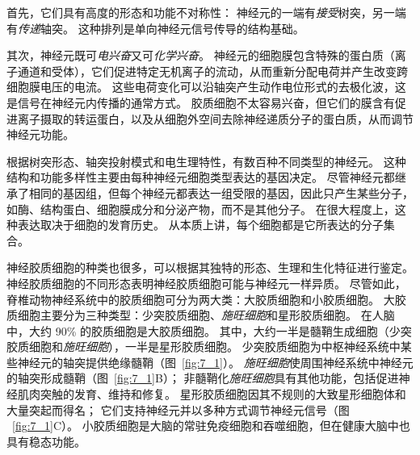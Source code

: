 首先，它们具有高度的形态和功能不对称性：
神经元的一端有\textit{接受}树突，另一端有\textit{传递}轴突。
这种排列是单向神经元信号传导的结构基础。


其次，神经元既可\textit{电兴奋}又可\textit{化学兴奋}。
神经元的细胞膜包含特殊的蛋白质（离子通道和受体），它们促进特定无机离子的流动，从而重新分配电荷并产生改变跨细胞膜电压的电流。
这些电荷变化可以沿轴突产生动作电位形式的去极化波，这是信号在神经元内传播的通常方式。
胶质细胞不太容易兴奋，但它们的膜含有促进离子摄取的转运蛋白，以及从细胞外空间去除神经递质分子的蛋白质，从而调节神经元功能。


根据树突形态、轴突投射模式和电生理特性，有数百种不同类型的神经元。
这种结构和功能多样性主要由每种神经元细胞类型表达的基因决定。
尽管神经元都继承了相同的基因组，但每个神经元都表达一组受限的基因，因此只产生某些分子，如酶、结构蛋白、细胞膜成分和分泌产物，而不是其他分子。
在很大程度上，这种表达取决于细胞的发育历史。
从本质上讲，每个细胞都是它所表达的分子集合。


神经胶质细胞的种类也很多，可以根据其独特的形态、生理和生化特征进行鉴定。
神经胶质细胞的不同形态表明神经胶质细胞可能与神经元一样异质。
尽管如此，脊椎动物神经系统中的胶质细胞可分为两大类：大胶质细胞和小胶质细胞。
大胶质细胞主要分为三种类型：少突胶质细胞、\textit{施旺细胞}和星形胶质细胞。
在人脑中，大约 90\% 的胶质细胞是大胶质细胞。
其中，大约一半是髓鞘生成细胞（少突胶质细胞和\textit{施旺细胞}），一半是星形胶质细胞。
少突胶质细胞为中枢神经系统中某些神经元的轴突提供绝缘髓鞘（图~\ref{fig:7_1}）。
\textit{施旺细胞}使周围神经系统中神经元的轴突形成髓鞘（图~\ref{fig:7_1}B）；
非髓鞘化\textit{施旺细胞}具有其他功能，包括促进神经肌肉突触的发育、维持和修复。
星形胶质细胞因其不规则的大致星形细胞体和大量突起而得名；
它们支持神经元并以多种方式调节神经元信号（图 ~\ref{fig:7_1}C）。 
小胶质细胞是大脑的常驻免疫细胞和吞噬细胞，但在健康大脑中也具有稳态功能。


